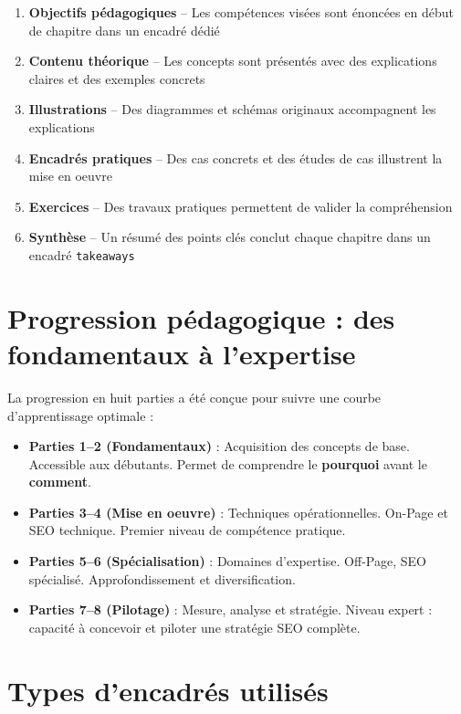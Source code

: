 \documentclass[12pt,a4paper,twoside]{report}
\newcommand{\keyword}[1]{\textbf{\textcolor{googleblue}{#1}}}
\begin{document}
\begin{enumerate}
    \item \textbf{Objectifs pédagogiques} -- Les compétences visées sont énoncées en début de chapitre dans un encadré dédié
    \item \textbf{Contenu théorique} -- Les concepts sont présentés avec des explications claires et des exemples concrets
    \item \textbf{Illustrations} -- Des diagrammes et schémas originaux accompagnent les explications
    \item \textbf{Encadrés pratiques} -- Des cas concrets et des études de cas illustrent la mise en oeuvre
    \item \textbf{Exercices} -- Des travaux pratiques permettent de valider la compréhension
    \item \textbf{Synthèse} -- Un résumé des points clés conclut chaque chapitre dans un encadré \texttt{takeaways}
\end{enumerate}

\section*{Progression pédagogique : des fondamentaux à l'expertise}

La progression en huit parties a été conçue pour suivre une courbe d'apprentissage optimale :

\begin{itemize}
    \item \textbf{Parties 1--2 (Fondamentaux)} : Acquisition des concepts de base. Accessible aux débutants. Permet de comprendre le \keyword{pourquoi} avant le \keyword{comment}.
    \item \textbf{Parties 3--4 (Mise en oeuvre)} : Techniques opérationnelles. On-Page et SEO technique. Premier niveau de compétence pratique.
    \item \textbf{Parties 5--6 (Spécialisation)} : Domaines d'expertise. Off-Page, SEO spécialisé. Approfondissement et diversification.
    \item \textbf{Parties 7--8 (Pilotage)} : Mesure, analyse et stratégie. Niveau expert : capacité à concevoir et piloter une stratégie SEO complète.
\end{itemize}

\section*{Types d'encadrés utilisés}
\end{document}
